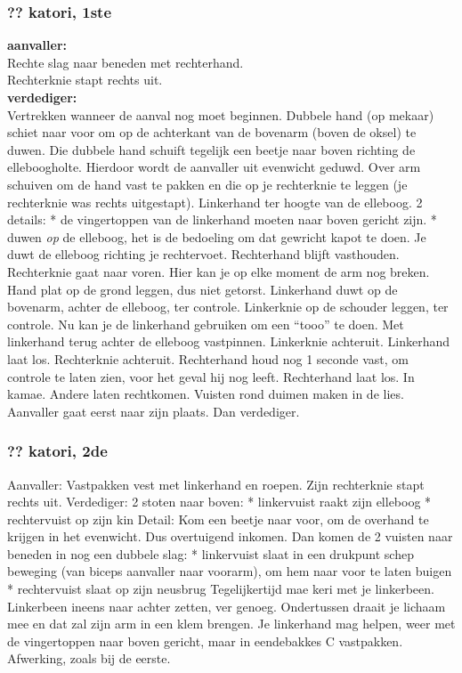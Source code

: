 \subsubsection{?? katori, 1ste}
\textbf{aanvaller:}\\
Rechte slag naar beneden met rechterhand.\\
Rechterknie stapt rechts uit.\\
\textbf{verdediger:}\\
Vertrekken wanneer de aanval nog moet beginnen.
Dubbele hand (op mekaar) schiet naar voor om op de achterkant van de bovenarm (boven de oksel) te duwen.
Die dubbele hand schuift tegelijk een beetje naar boven richting de elleboogholte.
Hierdoor wordt de aanvaller uit evenwicht geduwd.
Over arm schuiven om de hand vast te pakken en die op je rechterknie te leggen (je rechterknie was rechts uitgestapt).
Linkerhand ter hoogte van de elleboog.
2 details:
* de vingertoppen van de linkerhand moeten naar boven gericht zijn.
* duwen \textit{op} de elleboog, het is de bedoeling om dat gewricht kapot te doen.
Je duwt de elleboog richting je rechtervoet.
Rechterhand blijft vasthouden. Rechterknie gaat naar voren. Hier kan je op elke moment de arm nog breken.
Hand plat op de grond leggen, dus niet getorst.
Linkerhand duwt op de bovenarm, achter de elleboog, ter controle.
Linkerknie op de schouder leggen, ter controle.
Nu kan je de linkerhand gebruiken om een ``tooo'' te doen.
Met linkerhand terug achter de elleboog vastpinnen.
Linkerknie achteruit.
Linkerhand laat los.
Rechterknie achteruit.
Rechterhand houd nog 1 seconde vast, om controle te laten zien, voor het geval hij nog leeft.
Rechterhand laat los.
In kamae.
Andere laten rechtkomen.
Vuisten rond duimen maken in de lies.
Aanvaller gaat eerst naar zijn plaats.
Dan verdediger.

\subsubsection{?? katori, 2de}
Aanvaller:
Vastpakken vest met linkerhand en roepen.
Zijn rechterknie stapt rechts uit.
Verdediger:
2 stoten naar boven:
* linkervuist raakt zijn elleboog
* rechtervuist op zijn kin
Detail: Kom een beetje naar voor, om de overhand te krijgen in het evenwicht. Dus overtuigend inkomen.
Dan komen de 2 vuisten naar beneden in nog een dubbele slag:
* linkervuist slaat in een drukpunt schep beweging (van biceps aanvaller naar voorarm), om hem naar voor te laten buigen
* rechtervuist slaat op zijn neusbrug
Tegelijkertijd mae keri met je linkerbeen.
Linkerbeen ineens naar achter zetten, ver genoeg.
Ondertussen draait je lichaam mee en dat zal zijn arm in een klem brengen.
Je linkerhand mag helpen, weer met de vingertoppen naar boven gericht, maar in eendebakkes C vastpakken.
Afwerking, zoals bij de eerste.

